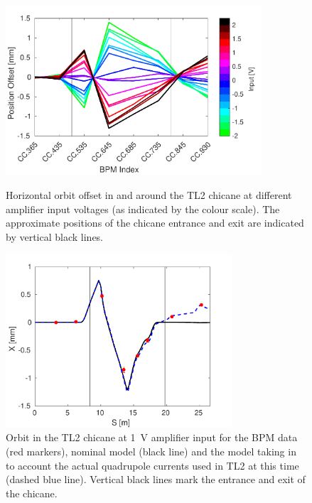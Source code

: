 \begin{figure}
  \centering
  \includegraphics[width=0.85\textwidth]{Figures/commissioning/HOrbitVsInput}
  \caption{Horizontal orbit offset in and around the TL2 chicane at different amplifier input voltages (as indicated by the colour scale). The approximate positions of the chicane entrance and exit are indicated by vertical black lines.}
  \label{f:HOrbitVsInput}
    \includegraphics[width=0.75\textwidth]{Figures/commissioning/orbClosureVsQuadModel}
  \caption{Orbit in the TL2 chicane at 1~V amplifier input for the BPM data (red markers), nominal model (black line) and the model taking in to account the actual quadrupole currents used in TL2 at this time (dashed blue line). Vertical black lines mark the entrance and exit
   of the chicane.}
  \label{f:orbClosureVsQuadModel}
\end{figure}


